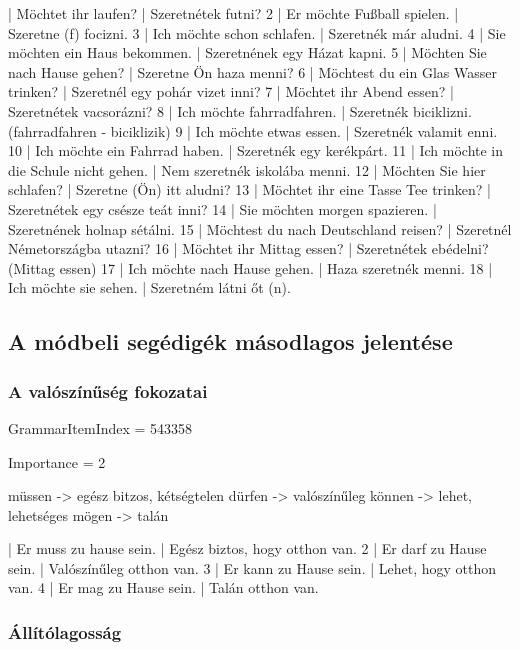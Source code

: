 \documentclass{article}
\newenvironment{desc}{\verbatim}{\endverbatim}
\newenvironment{exmp}{\verbatim}{\endverbatim}
\begin{document}
\begin{exmp}
1 | Möchtet ihr laufen? | Szeretnétek futni?
2 | Er möchte Fußball spielen. | Szeretne (f) focizni.
3 | Ich möchte schon schlafen. | Szeretnék már aludni.
4 | Sie möchten ein Haus bekommen. | Szeretnének egy Házat kapni.
5 | Möchten Sie nach Hause gehen? | Szeretne Ön haza menni?
6 | Möchtest du ein Glas Wasser trinken? | Szeretnél egy pohár vizet inni?
7 | Möchtet ihr Abend essen? | Szeretnétek vacsorázni?
8 | Ich möchte fahrradfahren. | Szeretnék biciklizni. (fahrradfahren - biciklizik)
9 | Ich möchte etwas essen. | Szeretnék valamit enni.
10 | Ich möchte ein Fahrrad haben. | Szeretnék egy kerékpárt.
11 | Ich möchte in die Schule nicht gehen. | Nem szeretnék iskolába menni.
12 | Möchten Sie hier schlafen? | Szeretne (Ön) itt aludni?
13 | Möchtet ihr eine Tasse Tee trinken? | Szeretnétek egy csésze teát inni?
14 | Sie möchten morgen spazieren. | Szeretnének holnap sétálni.
15 | Möchtest du nach Deutschland reisen? | Szeretnél Németországba utazni?
16 | Möchtet ihr Mittag essen? | Szeretnétek ebédelni? (Mittag essen)
17 | Ich möchte nach Hause gehen. | Haza szeretnék menni.
18 | Ich möchte sie sehen. | Szeretném látni őt (n).
\end{exmp}

\subsection{A módbeli segédigék másodlagos jelentése}

\subsubsection{A valószínűség fokozatai}

GrammarItemIndex = 543358

Importance = 2

\begin{desc}
müssen -> egész bitzos, kétségtelen
dürfen -> valószínűleg
können -> lehet, lehetséges
mögen -> talán
\end{desc}

\begin{exmp}
1 | Er muss zu hause sein. | Egész biztos, hogy otthon van.
2 | Er darf zu Hause sein. | Valószínűleg otthon van.
3 | Er kann zu Hause sein. | Lehet, hogy otthon van.
4 | Er mag zu Hause sein. | Talán otthon van.
\end{exmp}

\subsubsection{Állítólagosság}
\end{document}
